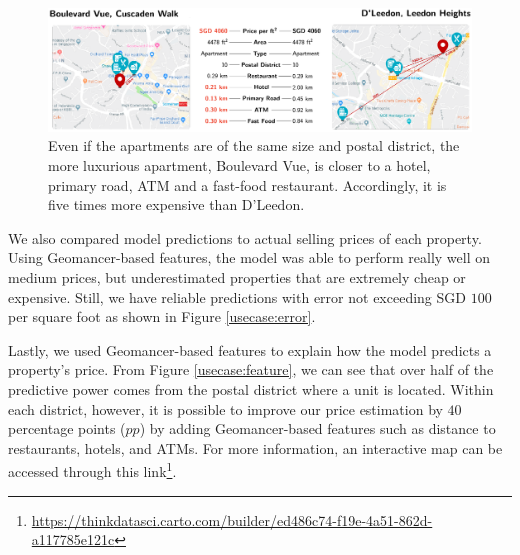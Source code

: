 \documentclass{article}
\begin{document}
\begin{figure}[h]
    \begin{center}
        \includegraphics[width=0.95\linewidth]{comparison.pdf}
    \end{center}
    \caption{
        Even if the apartments are of the same size and postal district, the
        more luxurious apartment, Boulevard Vue, is closer to a hotel, primary
        road, ATM and a fast-food restaurant. Accordingly, it is five times
        more expensive than D'Leedon.
    }
  \label{usecase:comparison}
\end{figure}

We also compared model predictions to actual selling prices of each property.
Using Geomancer-based features, the model was able to perform really well on
medium prices, but underestimated properties that are extremely cheap or
expensive. Still, we have reliable predictions with error not exceeding SGD $100$
per square foot as shown in Figure \ref{usecase:error}. 

Lastly, we used Geomancer-based features to explain how the model predicts a
property's price. From Figure \ref{usecase:feature}, we can see that over half
of the predictive power comes from the postal district where a unit is located.
Within each district, however, it is possible to improve our price estimation
by $40$ percentage points ($pp$) by adding Geomancer-based features such as
distance to restaurants, hotels, and ATMs. For more information, an interactive
map can be accessed through this
link\footnote{\url{https://thinkdatasci.carto.com/builder/ed486c74-f19e-4a51-862d-a117785e121c}}.
\end{document}
